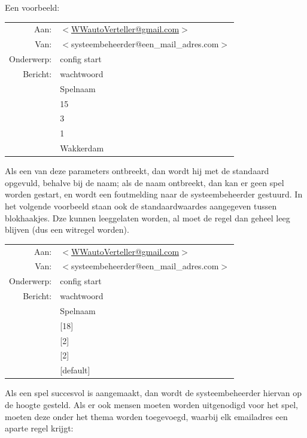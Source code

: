 \documentclass[12pt]{article}
\begin{document}
    Een voorbeeld:
    
    \begin{center}
      \begin{tabularx}{0.75\textwidth}[c]{|r X|}
	\hline
	Aan: & \href{mailto:<WWautoVerteller@gmail.com>}{$<$WWautoVerteller@gmail.com$>$} \\
	Van: & $<$systeembeheerder@een\_mail\_adres.com$>$ \\
	Onderwerp: & config start \\[\baselineskip]	
	Bericht: & wachtwoord \\
	 & Spelnaam \\
	 & 15 \\
	 & 3 \\
	 & 1 \\
	 & Wakkerdam \\
	\hline
      \end{tabularx}
    \end{center}
    
    Als een van deze parameters ontbreekt, dan wordt hij met de standaard opgevuld, behalve bij de naam; als de naam ontbreekt, dan kan er geen spel worden gestart, en wordt een foutmelding naar de systeembeheerder gestuurd. In het volgende voorbeeld staan ook de standaardwaardes aangegeven tussen blokhaakjes. Dze kunnen leeggelaten worden, al moet de regel dan geheel leeg blijven (dus een witregel worden).
    
    \begin{center}
      \begin{tabularx}{0.75\textwidth}[c]{|r X|}
	\hline
	Aan: & \href{mailto:<WWautoVerteller@gmail.com>}{$<$WWautoVerteller@gmail.com$>$} \\
	Van: & $<$systeembeheerder@een\_mail\_adres.com$>$ \\
	Onderwerp: & config start \\[\baselineskip]	
	Bericht: & wachtwoord \\
	 & Spelnaam \\
	 & [18] \\
	 & [2] \\
	 & [2] \\
	 & [default] \\
	\hline
      \end{tabularx}
    \end{center}
    
    Als een spel succesvol is aangemaakt, dan wordt de systeembeheerder hiervan op de hoogte gesteld. Als er ook mensen moeten worden uitgenodigd voor het spel, moeten deze onder het thema worden toegevoegd, waarbij elk emailadres een aparte regel krijgt:
    
\end{document}
